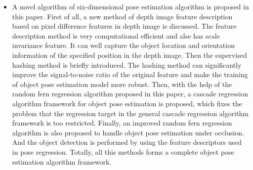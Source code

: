\begin{englishabstract}
\begin{itemize}
\item A novel algorithm of six-dimensional pose estimation algorithm is proposed in this paper. First of all, a new method of depth image feature description based on pixel difference features in depth image is discussed. The feature description method is very computational efficient and alse has scale invariance feature. It can well capture the object location and orientation information of the specified position in the depth image. Then the supervised hashing method is briefly introduced. The hashing method can significantly improve the signal-to-noise ratio of the original feature and make the training of object pose estimation model more robust. Then, with the help of the random fern regression algorithm proposed in this paper, a  cascade regression algorithm framework for object pose estimation is proposed, which fixes the problem that the regression target in the general cascade regression algorithm framework is too restricted. Finally, an improved random fern regression algorithm is also proposed to handle object pose estimation under occlusion. And the object detection is performed by using the feature descriptors used in pose regression. Totally, all this methods forms a complete object pose estimation algorithm framework.
\end{itemize}


\end{englishabstract}

